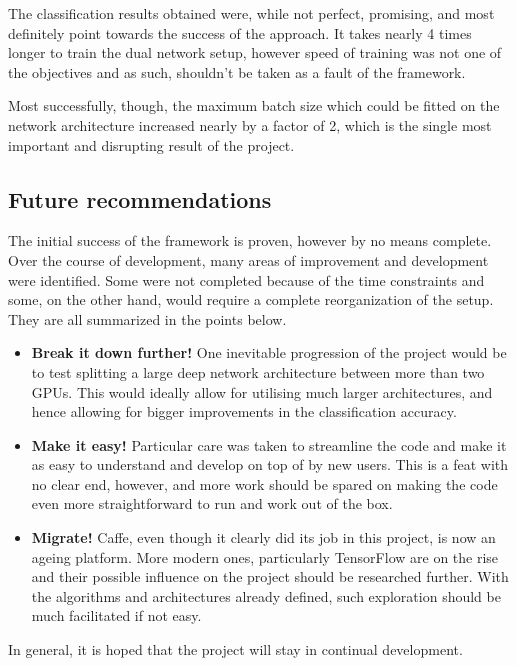 \documentclass[a4paper, 12pt]{article}
\numberwithin{equation}{section}
\begin{document}
	The classification results obtained were, while not perfect, promising, and most definitely point towards the success of the approach. It takes nearly 4 times longer to train the dual network setup, however speed of training was not one of the objectives and as such, shouldn't be taken as a fault of the framework.
	
	Most successfully, though, the maximum batch size which could be fitted on the network architecture increased nearly by a factor of 2, which is the single most important and disrupting result of the project.  
	
	\subsection{Future recommendations}
	
	The initial success of the framework is proven, however by no means complete. Over the course of development, many areas of improvement and development were identified. Some were not completed because of the time constraints and some, on the other hand, would require a complete reorganization of the setup. They are all summarized in the points below.
	
	\begin{itemize}
		\item \textbf{Break it down further!} One inevitable progression of the project would be to test splitting a large deep network architecture between more than two GPUs. This would ideally allow for utilising much larger architectures, and hence allowing for bigger improvements in the classification accuracy.
		\item \textbf{Make it easy!} Particular care was taken to streamline the code and make it as easy to understand and develop on top of by new users. This is a feat with no clear end, however, and more work should be spared on making the code even more straightforward to run and work out of the box.
		\item \textbf{Migrate!} Caffe, even though it clearly did its job in this project, is now an ageing platform. More modern ones, particularly TensorFlow are on the rise and their possible influence on the project should be researched further. With the algorithms and architectures already defined, such exploration should be much facilitated if not easy.
	\end{itemize}
	
	In general, it is hoped that the project will stay in continual development.
	
	\newpage
	
	\clearpage
	
	\newpage
	\pagestyle{plain}
	
	
	
	
\end{document}
